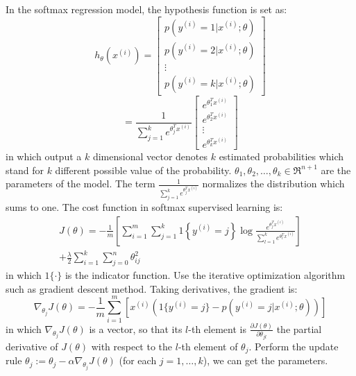 \documentclass[journal]{IEEEtran}
\begin{document}
In the softmax regression model, the hypothesis function is set as:
\begin{equation}
h_{\theta}(x^{(i)}) = 
\left[
      \begin{array}{cccccc}
        p(y^{(i)}=1|x^{(i)};\theta) \\
        p(y^{(i)}=2|x^{(i)};\theta) \\
        \vdots \\
        p(y^{(i)}=k|x^{(i)};\theta)
      \end{array}
    \right]
\end{equation}
\begin{equation}
= \frac{1}{\sum_{j=1}^ke^{\theta_j^Tx^{(i)}}}
\left[
      \begin{array}{cccccc}
        e^{\theta_1^Tx^{(i)}}\\
        e^{\theta_2^Tx^{(i)}}\\
        \vdots \\
        e^{\theta_k^Tx^{(i)}}
      \end{array}
    \right]
\end{equation}
in which output a $k$ dimensional vector denotes $k$ estimated probabilities which stand for $k$ different possible value of the probability. $\theta_1, \theta_2, \ldots, \theta_k \in \Re^{n+1}$ are the parameters of the model. The term $\frac{1}{ \sum_{j=1}^{k}{e^{ \theta_j^T x^{(i)} }} }$  normalizes the distribution which sums to one. The cost function in softmax supervised learning is:
\begin{equation}
\begin{split}
J(\theta) = - \frac{1}{m} \left[ \sum_{i=1}^{m} \sum_{j=1}^{k} 1\left\{y^{(i)} = j\right\} \log \frac{e^{\theta_j^T x^{(i)}}}{\sum_{l=1}^k e^{ \theta_l^T x^{(i)} }}  \right] \\
              + \frac{\lambda}{2} \sum_{i=1}^k \sum_{j=0}^n \theta_{ij}^2
\end{split}
\end{equation}
in which $1\{\cdot\}$ is the indicator function.
Use the iterative optimization algorithm such as gradient descent method. Taking derivatives, the gradient is:
\begin{equation}
\nabla_{\theta_j} J(\theta) = - \frac{1}{m} \sum_{i=1}^{m}{ [ x^{(i)} ( 1\{ y^{(i)} = j\}  - p(y^{(i)} = j | x^{(i)}; \theta) ) ]}
\end{equation}
in which  $\nabla_{\theta_j} J(\theta)$ is a vector, so that its $l$-th element is $\frac{\partial J(\theta)}{\partial \theta_{jl}}$ the partial derivative of $J(\theta)$ with respect to the $l$-th element of $\theta_j$.
Perform the update rule $\theta_j := \theta_j - \alpha \nabla_{\theta_j} J(\theta)$ (for each $j=1,\ldots,k$), we can get the parameters.
\end{document}
